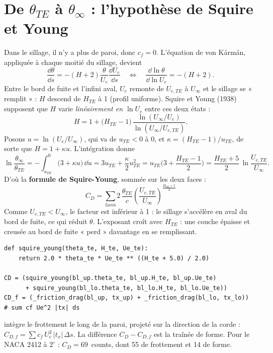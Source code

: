 \section{De $\theta_{TE}$ à $\theta_\infty$ : l'hypothèse de Squire et Young}
Dans le sillage, il n'y a plus de paroi, donc $c_f=0$. L'équation de von Kármán, appliquée à chaque moitié du sillage, devient
\[
\frac{\dd\theta}{\dd s}=-(H+2)\frac{\theta}{U_e}\frac{\dd U_e}{\dd s}
\quad\Longleftrightarrow\quad
\frac{\dd\ln\theta}{\dd\ln U_e}=-(H+2).
\]
Entre le bord de fuite et l'infini aval, $U_e$ remonte de $U_{e,TE}$ à $U_\infty$ et le sillage se « remplit » : $H$ descend de $H_{TE}$ à 1 (profil uniforme). Squire et Young (1938) supposent que $H$ varie \emph{linéairement en $\ln U_e$} entre ces deux états :
\[
H=1+\big(H_{TE}-1\big)\,\frac{\ln(U_\infty/U_e)}{\ln(U_\infty/U_{e,TE})}.
\]
Posons $u=\ln(U_e/U_\infty)$, qui va de $u_{TE}<0$ à 0, et $\kappa=(H_{TE}-1)/u_{TE}$, de sorte que $H=1+\kappa u$. L'intégration donne
\[
\ln\frac{\theta_\infty}{\theta_{TE}}=-\int_{u_{TE}}^0\big(3+\kappa u\big)\,\dd u
=3u_{TE}+\frac{\kappa}{2}u_{TE}^2
=u_{TE}\Big(3+\frac{H_{TE}-1}{2}\Big)=\frac{H_{TE}+5}{2}\,\ln\frac{U_{e,TE}}{U_\infty}.
\]
D'où la \textbf{formule de Squire-Young}, sommée sur les deux faces :
\[
\boxed{\ C_D=\sum_{\text{faces}}2\,\frac{\theta_{TE}}{c}\left(\frac{U_{e,TE}}{U_\infty}\right)^{\frac{H_{TE}+5}{2}}\ }
\]
Comme $U_{e,TE}<U_\infty$, le facteur est inférieur à 1 : le sillage s'accélère en aval du bord de fuite, ce qui réduit $\theta$. L'exposant croît avec $H_{TE}$ : une couche épaisse et creusée au bord de fuite « perd » davantage en se remplissant.

\begin{codebox}
\begin{lstlisting}
def squire_young(theta_te, H_te, Ue_te):
    return 2.0 * theta_te * Ue_te ** ((H_te + 5.0) / 2.0)

CD = (squire_young(bl_up.theta_te, bl_up.H_te, bl_up.Ue_te)
      + squire_young(bl_lo.theta_te, bl_lo.H_te, bl_lo.Ue_te))
CD_f = (_friction_drag(bl_up, tx_up) + _friction_drag(bl_lo, tx_lo))   # sum cf Ue^2 |tx| ds
\end{lstlisting}
 intègre le frottement le long de la paroi, projeté sur la direction de la corde : $C_{D,f}=\sum c_f\,U_e^2\,|t_x|\,\Delta s$. La différence $C_D-C_{D,f}$ est la traînée de forme. Pour le NACA 2412 à $2^\circ$ : $C_D=69$~counts, dont 55 de frottement et 14 de forme.
\end{codebox}

